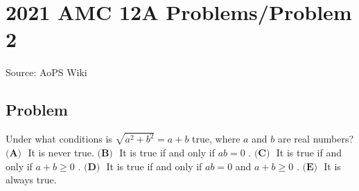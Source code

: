 \documentclass[12pt]{article}
\begin{document}
\section*{{2021 AMC 12A Problems/Problem 2}}
Source: AoPS Wiki

\subsection*{Problem}
Under what conditions is $\sqrt{a^2+b^2}=a+b$ true, where $a$ and $b$ are real numbers? $\textbf{(A) }$ It is never true. $\textbf{(B) }$ It is true if and only if $ab=0$ . $\textbf{(C) }$ It is true if and only if $a+b\ge 0$ . $\textbf{(D) }$ It is true if and only if $ab=0$ and $a+b\ge 0$ . $\textbf{(E) }$ It is always true.
\end{document}

